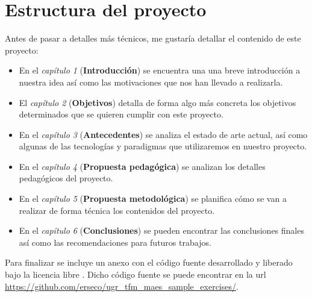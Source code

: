 \section{Estructura del proyecto}


\bigskip
Antes de pasar a detalles más técnicos, me gustaría detallar el contenido de este proyecto:

\begin{itemize}
  \item En el \textit{capítulo 1} (\textbf{Introducción}) se encuentra una una breve introducción a nuestra idea así como las motivaciones que nos han llevado a realizarla.
  \item El \textit{capítulo 2} (\textbf{Objetivos}) detalla de forma algo más concreta los objetivos determinados que se quieren cumplir con este proyecto.
  \item En el \textit{capítulo 3} (\textbf{Antecedentes}) se analiza el estado de arte actual, así como algunas de las tecnologías y paradigmas que utilizaremos en nuestro proyecto.
  \item En el \textit{capítulo 4} (\textbf{Propuesta pedagógica}) se analizan los detalles pedagógicos del proyecto.
  \item En el \textit{capítulo 5} (\textbf{Propuesta metodológica}) se planifica cómo se van a realizar de forma técnica los contenidos del proyecto.
  \item En el \textit{capítulo 6} (\textbf{Conclusiones}) se pueden encontrar las conclusiones finales así como las recomendaciones para futuros trabajos.

\end{itemize}


\bigskip
Para finalizar se incluye un anexo con el código fuente desarrollado y liberado bajo la licencia libre \cite{gplv3}. Dicho código fuente se puede encontrar en la url \url{https://github.com/erseco/ugr_tfm_maes_sample_exercises/}.







